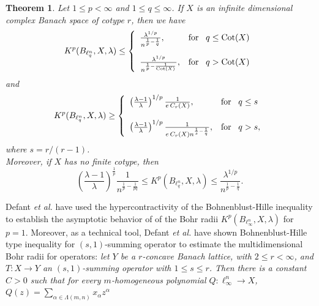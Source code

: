 \documentclass[a4paper,12pt]{amsart}
\newtheorem{thm}{Theorem}[section]
\theoremstyle{definition}
\newcounter {own}
\begin{document}
\begin{thm}\label{Pal-Vasu-P5-thm-02}
	Let $1\leq p<\infty$ and $1\leq q\leq \infty$. If $X$ is an infinite dimensional complex Banach space of cotype $r$, then we have 
	$$
	K^p(B_{\ell^n_q},X,\lambda)\leq \left\{\begin{array}{ll}
		\frac{\lambda^{1/p}}{n^{\frac{1}{p}-\frac{1}{q}}}, & \mbox{for \, $q\leq \text{Cot}(X)$}\\[5mm] 
		
		\frac{\lambda^{1/p}}{n^{\frac{1}{p}-\frac{1}{\text{Cot}(X)}}}, & \mbox{for \, $q>\text{Cot}(X)$}
	\end{array}\right.
	$$
	and 
	$$
	K^p(B_{\ell^n_q},X,\lambda)\geq \left\{\begin{array}{ll}
		\left(\frac{\lambda-1}{\lambda}\right)^{1/p}\frac{1}{e\, C_r(X)}, & \mbox{for \, $q\leq s$}\\[5mm] 
		
		\left(\frac{\lambda-1}{\lambda}\right)^{1/p}\frac{1}{e\,C_r(X)n^{\frac{1}{s}-\frac{1}{q}}}, & \mbox{for \, $q>s$},
	\end{array}\right.
	$$
	where $s=r/(r-1)$.\\
	
	\noindent
	Moreover, if $X$ has no finite cotype, then 
	\begin{equation*}
		\left(\frac{\lambda-1}{\lambda}\right)^{\frac{1}{p}}\frac{1}{n^{\frac{1}{p}-\frac{1}{pq}}} \leq K^p(B_{\ell^n_q},X,\lambda) \leq \frac{\lambda^{1/p}}{n^{\frac{1}{p}-\frac{1}{q}}}.
	\end{equation*}
\end{thm}
\vspace{4mm}

Defant {\it et al.} \cite[Theorem 4.1]{defant-adv-math-2012} have used the hypercontractivity of the Bohnenblust-Hille inequality to establish the asymptotic behavior of of the Bohr radii $K^p(B_{\ell^n_{\infty}},X, \lambda)$ for $p=1$. Moreover, as a technical tool, Defant {\it et al.} \cite[Theorem 5.3]{defant-adv-math-2012} have shown Bohnenblust-Hille type inequality for $(s,1)$-summing operator to estimate the multidimensional Bohr radii for operators: {\it let $Y$ be a $r$-concave Banach lattice, with $2\leq r<\infty$, and $T:X\rightarrow Y$ an $(s,1)$-summing operator with $1\leq s\leq r$. Then there is a constant $C>0$ such that for every $m$-homogeneous polynomial $Q:\ell^n_{\infty}\rightarrow X$, $Q(z)=\sum_{\alpha \in\Lambda(m,n)}x_{\alpha}z^{\alpha}$}
\end{document}
